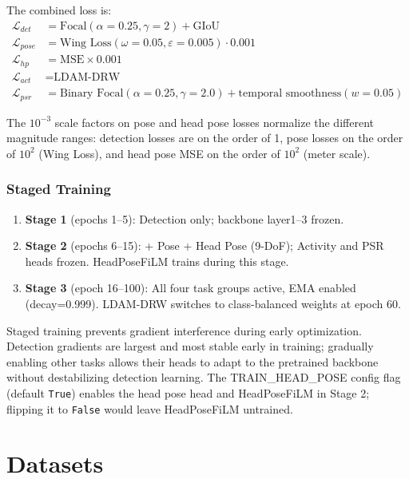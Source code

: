 \documentclass[11pt,a4paper]{article}
\begin{document}
The combined loss is:
\begin{align*}
\mathcal{L}_{det} &= \text{Focal}(\alpha=0.25, \gamma=2) + \text{GIoU} \\
\mathcal{L}_{pose} &= \text{Wing Loss}(\omega=0.05, \varepsilon=0.005) \cdot 0.001 \\
\mathcal{L}_{hp} &= \text{MSE} \times 0.001 \\
\mathcal{L}_{act} &= \text{LDAM-DRW} \\
\mathcal{L}_{psr} &= \text{Binary Focal}(\alpha=0.25, \gamma=2.0) + \text{temporal smoothness}(w=0.05)
\end{align*}

The $10^{-3}$ scale factors on pose and head pose losses normalize the different magnitude ranges: detection losses are on the order of 1, pose losses on the order of $10^2$ (Wing Loss), and head pose MSE on the order of $10^2$ (meter scale).

\subsubsection{Staged Training}
\begin{enumerate}
\item \textbf{Stage 1} (epochs 1--5): Detection only; backbone layer1--3 frozen.
\item \textbf{Stage 2} (epochs 6--15): + Pose + Head Pose (9-DoF); Activity and PSR heads frozen. HeadPoseFiLM trains during this stage.
\item \textbf{Stage 3} (epoch 16--100): All four task groups active, EMA enabled (decay=0.999). LDAM-DRW switches to class-balanced weights at epoch 60.
\end{enumerate}

Staged training prevents gradient interference during early optimization. Detection gradients are largest and most stable early in training; gradually enabling other tasks allows their heads to adapt to the pretrained backbone without destabilizing detection learning. The TRAIN\_HEAD\_POSE config flag (default \texttt{True}) enables the head pose head and HeadPoseFiLM in Stage 2; flipping it to \texttt{False} would leave HeadPoseFiLM untrained.

\section{Datasets}
\label{sec:datasets}
\end{document}
